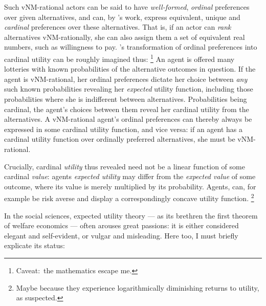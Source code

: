 Such \gls{vNM}-rational actors can be said to have \emph{well-formed}, \emph{ordinal} preferences over given alternatives, and can, by \citeauthor{VonNeumannMorgenstern1944}'s work, express equivalent, unique and \emph{cardinal} preferences over these alternatives.
That is, if an actor can \emph{rank} alternatives \gls{vNM}-rationally, she can also assign them a set of equivalent real numbers, such as willingness to pay.
\citeauthor{VonNeumannMorgenstern1944}'s transformation of ordinal preferences into cardinal utility can be roughly imagined thus:
\footnote{
	Caveat:\ the mathematics escape me.
}
An agent is offered many lotteries with known probabilities of the alternative outcomes in question.
If the agent is \gls{vNM}-rational, her ordinal preferences dictate her choice between \emph{any} such known probabilities revealing her \emph{expected} utility function, including those probabilities where she is indifferent between alternatives.
Probabilities being cardinal, the agent's choices between them reveal her cardinal utility from the alternatives.
A \gls{vNM}-rational agent's ordinal preferences can thereby always be expressed in some cardinal utility function, and vice versa:
if an agent has a cardinal utility function over ordinally preferred alternatives, she must be \gls{vNM}-rational.

Crucially, cardinal \emph{utility} thus revealed need not be a linear function of some cardinal \emph{value}:
agents \emph{expected utility} may differ from the \emph{expected value} of some outcome, where its value is merely multiplied by its probability.
Agents, can, for example be risk averse and display a correspondingly concave utility function.
\footnote{
	Maybe because they experience logarithmically diminishing returns to utility, as \cite{Bernoulli1738} suspected.
}

In the social sciences, expected utility theory --- as its brethren the first theorem of welfare economics --- often arouses great passions:
it is either considered elegant and self-evident, or vulgar and misleading.
Here too, I must briefly explicate its status:

